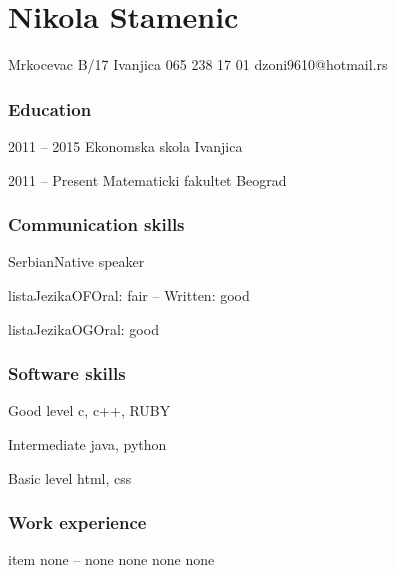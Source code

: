 \documentclass{tccv}
\begin{document}
\part{Nikola Stamenic}
\personal
    {Mrkocevac B/17 Ivanjica}
    {065 238 17 01}
    {dzoni9610@hotmail.rs}
\section{Education}
\begin{yearlist}
\item[]{2011 -- 2015}
     {Ekonomska skola Ivanjica}
     {}
\item{2011 -- Present}
     {Matematicki fakultet Beograd}
     {}
\end{yearlist}
\section{Communication skills}
\begin{factlist}
\item{Serbian}{Native speaker}
\item{listaJezikaOF}{Oral: fair -- Written: good}
\item{listaJezikaOG}{Oral: good}
\end{factlist}

\section{Software skills}
\begin{factlist}
\item{Good level}
     {c, c++, RUBY	}
\item{Intermediate}
     {java, python}
\item{Basic level}
     {html, css}
\end{factlist}
\pagebreak

\section{Work experience}
            \begin{eventlist}
                item{ none -- none}
                   {none}
                   {none}
                   none
\end{eventlist}
\end{document}
